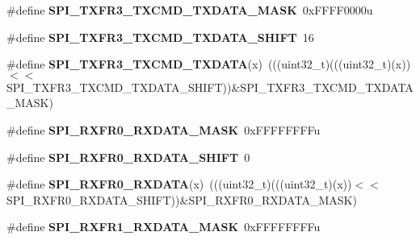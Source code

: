 \begin{DoxyCompactItemize}
\item 
\#define {\bfseries S\+P\+I\+\_\+\+T\+X\+F\+R3\+\_\+\+T\+X\+C\+M\+D\+\_\+\+T\+X\+D\+A\+T\+A\+\_\+\+M\+A\+SK}~0x\+F\+F\+F\+F0000u\hypertarget{group__SPI__Register__Masks_ga5db2d61f529d80173f78729f46c098a9}{}\label{group__SPI__Register__Masks_ga5db2d61f529d80173f78729f46c098a9}

\item 
\#define {\bfseries S\+P\+I\+\_\+\+T\+X\+F\+R3\+\_\+\+T\+X\+C\+M\+D\+\_\+\+T\+X\+D\+A\+T\+A\+\_\+\+S\+H\+I\+FT}~16\hypertarget{group__SPI__Register__Masks_ga22a70393315807bfa3480a1892da3531}{}\label{group__SPI__Register__Masks_ga22a70393315807bfa3480a1892da3531}

\item 
\#define {\bfseries S\+P\+I\+\_\+\+T\+X\+F\+R3\+\_\+\+T\+X\+C\+M\+D\+\_\+\+T\+X\+D\+A\+TA}(x)~(((uint32\+\_\+t)(((uint32\+\_\+t)(x))$<$$<$S\+P\+I\+\_\+\+T\+X\+F\+R3\+\_\+\+T\+X\+C\+M\+D\+\_\+\+T\+X\+D\+A\+T\+A\+\_\+\+S\+H\+I\+FT))\&S\+P\+I\+\_\+\+T\+X\+F\+R3\+\_\+\+T\+X\+C\+M\+D\+\_\+\+T\+X\+D\+A\+T\+A\+\_\+\+M\+A\+SK)\hypertarget{group__SPI__Register__Masks_gabd1aff6c08d7a7334407f5a122fb2684}{}\label{group__SPI__Register__Masks_gabd1aff6c08d7a7334407f5a122fb2684}

\item 
\#define {\bfseries S\+P\+I\+\_\+\+R\+X\+F\+R0\+\_\+\+R\+X\+D\+A\+T\+A\+\_\+\+M\+A\+SK}~0x\+F\+F\+F\+F\+F\+F\+F\+Fu\hypertarget{group__SPI__Register__Masks_ga61ebb4d00d387b335d5b9d64d024e16f}{}\label{group__SPI__Register__Masks_ga61ebb4d00d387b335d5b9d64d024e16f}

\item 
\#define {\bfseries S\+P\+I\+\_\+\+R\+X\+F\+R0\+\_\+\+R\+X\+D\+A\+T\+A\+\_\+\+S\+H\+I\+FT}~0\hypertarget{group__SPI__Register__Masks_ga030988e177b7d3ab914b5bb4cd734463}{}\label{group__SPI__Register__Masks_ga030988e177b7d3ab914b5bb4cd734463}

\item 
\#define {\bfseries S\+P\+I\+\_\+\+R\+X\+F\+R0\+\_\+\+R\+X\+D\+A\+TA}(x)~(((uint32\+\_\+t)(((uint32\+\_\+t)(x))$<$$<$S\+P\+I\+\_\+\+R\+X\+F\+R0\+\_\+\+R\+X\+D\+A\+T\+A\+\_\+\+S\+H\+I\+FT))\&S\+P\+I\+\_\+\+R\+X\+F\+R0\+\_\+\+R\+X\+D\+A\+T\+A\+\_\+\+M\+A\+SK)\hypertarget{group__SPI__Register__Masks_gaefa909022ef28f93b77915a01f7456c6}{}\label{group__SPI__Register__Masks_gaefa909022ef28f93b77915a01f7456c6}

\item 
\#define {\bfseries S\+P\+I\+\_\+\+R\+X\+F\+R1\+\_\+\+R\+X\+D\+A\+T\+A\+\_\+\+M\+A\+SK}~0x\+F\+F\+F\+F\+F\+F\+F\+Fu\hypertarget{group__SPI__Register__Masks_gae5778ef350adb171937498b1b49ffdb0}{}\label{group__SPI__Register__Masks_gae5778ef350adb171937498b1b49ffdb0}


\end{DoxyCompactItemize}
